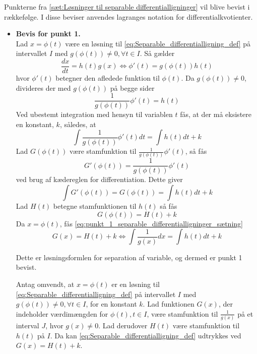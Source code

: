 \begin{bev}
    Punkterne fra \autoref{sæt:Løsninger til separable differentialligninger} vil blive bevist i rækkefølge. I disse beviser anvendes lagranges notation for differentialkvotienter.
    
    \begin{itemize}
        \item[] \textbf{Bevis for punkt 1.}\\ 
            Lad $x = \phi(t)$ være en løsning til \eqref{eq:Separable_differentialligning_def} på intervallet $I$ med $g\left(\phi(t)\right) \neq 0, \forall t\in I$. Så gælder
            $$ \frac{dx}{dt} = h(t)g(x) \Leftrightarrow \phi'(t) = g\left(\phi(t)\right) h(t) $$
            hvor $\phi'(t)$ betegner den afledede funktion til $\phi(t)$. Da $g\left(\phi(t)\right) \neq 0$, divideres der med $g\left(\phi(t)\right)$ på begge sider
            $$ \frac{1}{g\left(\phi(t)\right)} \phi'(t) = h(t) $$
            Ved ubestemt integration med hensyn til variablen $t$ fås, at der må eksistere en konstant, $k$, således, at
            $$ \int \frac{1}{g\left(\phi(t)\right)} \phi'(t) dt  = \int h(t) dt + k $$
            Lad $G\left(\phi(t)\right)$ være stamfunktion til $\frac{1}{g\left(\phi(t)\right)}\phi'(t)$, så fås
            $$ G'\left(\phi(t)\right) = \frac{1}{g\left(\phi(t)\right)} \phi'(t) $$ 
            ved brug af kædereglen for differentiation. Dette giver
            $$ \int G'\left(\phi(t)\right) = G\left(\phi(t)\right) = \int h(t) dt + k $$
            Lad $H(t)$ betegne stamfunktionen til $h(t)$ så fås
            $$ G\left(\phi(t)\right) = H(t) + k $$
            Da $x = \phi(t)$, fås \ref{eq:punkt_1_separable_differentialligninger_sætning}
            $$ G(x) = H(t) + k \Leftrightarrow\int \frac{1}{g(x)} dx = \int h(t) dt + k $$
        
        Dette er løsningsformlen for separation af variable, og dermed er punkt 1 bevist. 

        Antag omvendt, at $x =\phi(t)$ er en løsning til \eqref{eq:Separable_differentialligning_def} på intervallet $I$ med $g\left(\phi(t)\right) \neq 0, \forall t\in I$, for en konstant $k$. Lad funktionen $G(x)$, der indeholder værdimængden for $\phi(t), t\in I$, være stamfunktion til $\frac{1}{g(x)}$ på et interval $J$, hvor $g(x)\neq 0$. Lad derudover $H(t)$ være stamfunktion til $h(t)$ på $I$. Da kan \eqref{eq:Separable_differentialligning_def} udtrykkes ved $G(x)=H(t)+k$.
        

\end{itemize}
\end{bev}
